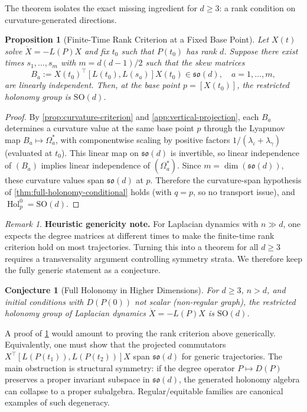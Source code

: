 \documentclass{article}
\newcommand{\so}{\mathfrak{so}}
\DeclareMathOperator{\Hol}{Hol}
\theoremstyle{plain}
\newtheorem{proposition}{Proposition}
\newtheorem{conjecture}{Conjecture}
\theoremstyle{definition}
\theoremstyle{remark}
\newtheorem*{remark}{Remark}
\begin{document}
The theorem isolates the exact missing ingredient for $d \ge 3$: a rank condition on curvature-generated directions.

\begin{proposition}[Finite-Time Rank Criterion at a Fixed Base Point]\label{prop:finite-time-rank}
Let $X(t)$ solve $\dot{X} = -L(P) X$ and fix $t_0$ such that $P(t_0)$ has rank $d$.
Suppose there exist times $s_1, \ldots, s_m$ with $m = d(d-1)/2$ such that the skew matrices
\begin{equation}
B_a := X(t_0)^\top [L(t_0), L(s_a)] X(t_0) \in \so(d), \quad a = 1, \ldots, m,
\end{equation}
are linearly independent.
Then, at the base point $p = [X(t_0)]$, the restricted holonomy group is $\mathrm{SO}(d)$.
\end{proposition}

\begin{proof}
By \cref{prop:curvature-criterion} and \cref{app:vertical-projection}, each $B_a$ determines a curvature value at the same base point $p$ through the Lyapunov map
$B_a \mapsto \Omega_a^*$,
with componentwise scaling by positive factors $1/(\lambda_\iota + \lambda_\gamma)$ (evaluated at $t_0$).
This linear map on $\so(d)$ is invertible, so linear independence of $(B_a)$ implies linear independence of $(\Omega_a^*)$.
Since $m = \dim(\so(d))$, these curvature values span $\so(d)$ at $p$.
Therefore the curvature-span hypothesis of \cref{thm:full-holonomy-conditional} holds (with $q = p$, so no transport issue), and $\Hol_p^0 = \mathrm{SO}(d)$.
\end{proof}

\begin{remark}
\textbf{Heuristic genericity note.}
For Laplacian dynamics with $n \gg d$, one expects the degree matrices at different times to make the finite-time rank criterion hold on most trajectories.
Turning this into a theorem for all $d \ge 3$ requires a transversality argument controlling symmetry strata.
We therefore keep the fully generic statement as a conjecture.
\end{remark}

\begin{conjecture}[Full Holonomy in Higher Dimensions]\label{conj:full-holonomy}
For $d \ge 3$, $n > d$, and initial conditions with $D(P(0))$ not scalar (non-regular graph), the restricted holonomy group of Laplacian dynamics $\dot{X} = -L(P) X$ is $\mathrm{SO}(d)$.
\end{conjecture}

A proof of \cref{conj:full-holonomy} would amount to proving the rank criterion above generically.
Equivalently, one must show that the projected commutators
$X^\top [L(P(t_1)), L(P(t_2))] X$
span $\so(d)$ for generic trajectories.
The main obstruction is structural symmetry: if the degree operator $P \mapsto D(P)$ preserves a proper invariant subspace in $\so(d)$, the generated holonomy algebra can collapse to a proper subalgebra.
Regular/equitable families are canonical examples of such degeneracy.
\end{document}
